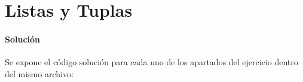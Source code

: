 \section{Listas y Tuplas}
  
  \paragraph{Solución}
  Se expone el código solución para cada
  uno de los apartados del ejercicio dentro
  del mismo archivo:
  
  